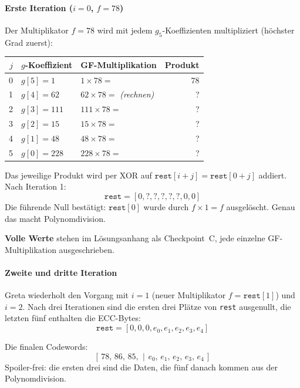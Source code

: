 \paragraph{Erste Iteration ($i=0$, $f = 78$)}

Der Multiplikator $f = 78$ wird mit jedem $g_5$-Koeffizienten
multipliziert (höchster Grad zuerst):

\begin{center}
\begin{tabular}{rllr}
\toprule
$j$ & $g$-Koeffizient & GF-Multiplikation & Produkt \\
\midrule
0 & $g[5] = 1$   & $1 \times 78 = $        & $78$ \\
1 & $g[4] = 62$  & $62 \times 78 =$ \textit{(rechnen)} & ? \\
2 & $g[3] = 111$ & $111 \times 78 = $      & ? \\
3 & $g[2] = 15$  & $15 \times 78 = $       & ? \\
4 & $g[1] = 48$  & $48 \times 78 = $       & ? \\
5 & $g[0] = 228$ & $228 \times 78 = $      & ? \\
\bottomrule
\end{tabular}
\end{center}

Das jeweilige Produkt wird per XOR auf
$\texttt{rest}[i + j] = \texttt{rest}[0 + j]$ addiert. Nach Iteration 1:
\[
  \texttt{rest} = [0, ?, ?, ?, ?, ?, 0, 0]
\]
Die führende Null bestätigt: $\texttt{rest}[0]$ wurde durch
$f \times 1 = f$ ausgelöscht. Genau das macht Polynomdivision.

\textbf{Volle Werte} stehen im Lösungsanhang als Checkpoint~C, jede
einzelne GF-Multiplikation ausgeschrieben.

\paragraph{Zweite und dritte Iteration}

Greta wiederholt den Vorgang mit $i = 1$ (neuer Multiplikator
$f = \texttt{rest}[1]$) und $i = 2$. Nach drei Iterationen sind die
ersten drei Plätze von \texttt{rest} ausgenullt, die letzten fünf
enthalten die ECC-Bytes:
\[
  \texttt{rest} = [0, 0, 0, e_0, e_1, e_2, e_3, e_4]
\]

Die finalen Codewords:
\[
  [\,78,\, 86,\, 85,\,\ |\ \,e_0,\, e_1,\, e_2,\, e_3,\, e_4\,]
\]
Spoiler-frei: die ersten drei sind die Daten, die fünf danach kommen
aus der Polynomdivision.

